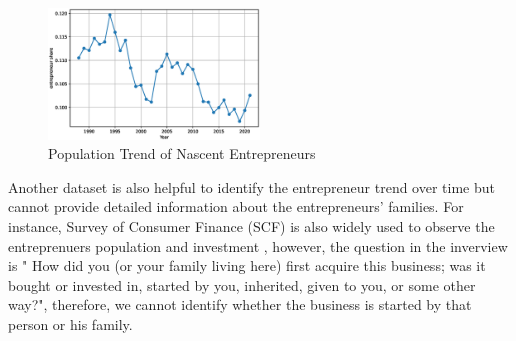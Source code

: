 \begin{figure}[htp!]
    \centering
    \includegraphics[width=0.5\textwidth]{nascententrepreneursharecps.eps}
    \caption{Population Trend of Nascent Entrepreneurs}
    \label{nascent}
\end{figure}


Another dataset is also helpful to identify the entrepreneur trend over time but cannot provide detailed information about the entrepreneurs' families. For instance, Survey of Consumer Finance (SCF) is also widely used to observe the entreprenuers population and investment \citep{moskowitz2002returns, cagetti2006entrepreneurship}, however, the question in the inverview is " How did you (or your family living here) first acquire this business; was it bought or invested in, started by you,  inherited, given to you, or some other way?", therefore, we cannot identify whether the business is started by that person or his family.


 





